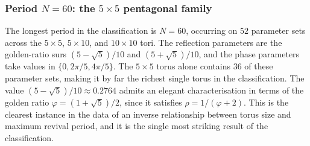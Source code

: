 \subsubsection{Period $N = 60$: the $5 \times 5$ pentagonal family}

The longest period in the classification is $N = 60$, occurring on
$52$ parameter sets across the $5 \times 5$, $5 \times 10$, and
$10 \times 10$ tori. The reflection parameters are the golden-ratio
surs $(5-\sqrt{5})/10$ and $(5+\sqrt{5})/10$, and the phase parameters
take values in $\{0, 2\pi/5, 4\pi/5\}$. The $5 \times 5$ torus alone
contains $36$ of these parameter sets, making it by far the richest
single torus in the classification. The value
$(5-\sqrt{5})/10 \approx 0.2764$ admits an elegant characterisation in
terms of the golden ratio $\varphi = (1+\sqrt{5})/2$, since it satisfies
$\rho = 1/(\varphi + 2)$. This is the clearest instance in the data of
an inverse relationship between torus size and maximum revival period,
and it is the single most striking result of the classification.
